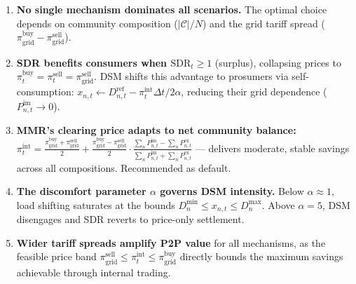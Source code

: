 \documentclass[11pt]{article}
\begin{document}
\begin{enumerate}

\item \textbf{No single mechanism dominates all scenarios.} The optimal choice depends on community composition ($|\mathcal{C}|/N$) and the grid tariff spread ($\pi_{\text{grid}}^{\text{buy}} - \pi_{\text{grid}}^{\text{sell}}$).

\item \textbf{SDR benefits consumers when $\text{SDR}_t \geq 1$} (surplus), collapsing prices to $\pi_t^{\text{buy}} = \pi_t^{\text{sell}} = \pi_{\text{grid}}^{\text{sell}}$. DSM shifts this advantage to prosumers via self-consumption: $x_{n,t} \leftarrow D_{n,t}^{\text{ref}} - \pi_t^{\text{int}} \Delta t / 2\alpha$, reducing their grid dependence ($P_{n,t}^{\text{im}} \to 0$).

\item \textbf{MMR's clearing price adapts to net community balance:}
$\pi_t^{\text{int}} = \frac{\pi_{\text{grid}}^{\text{buy}} + \pi_{\text{grid}}^{\text{sell}}}{2} + \frac{\pi_{\text{grid}}^{\text{buy}} - \pi_{\text{grid}}^{\text{sell}}}{2} \cdot \frac{\sum_n P_{n,t}^{\text{im}} - \sum_n P_{n,t}^{\text{ex}}}{\sum_n P_{n,t}^{\text{im}} + \sum_n P_{n,t}^{\text{ex}}}$
--- delivers moderate, stable savings across all compositions. Recommended as default.

\item \textbf{The discomfort parameter $\alpha$ governs DSM intensity.} Below $\alpha \approx 1$, load shifting saturates at the bounds $D_n^{\text{min}} \leq x_{n,t} \leq D_n^{\text{max}}$. Above $\alpha = 5$, DSM disengages and SDR reverts to price-only settlement.

\item \textbf{Wider tariff spreads amplify P2P value} for all mechanisms, as the feasible price band $\pi_{\text{grid}}^{\text{sell}} \leq \pi_t^{\text{int}} \leq \pi_{\text{grid}}^{\text{buy}}$ directly bounds the maximum savings achievable through internal trading.

\end{enumerate}
\end{document}
